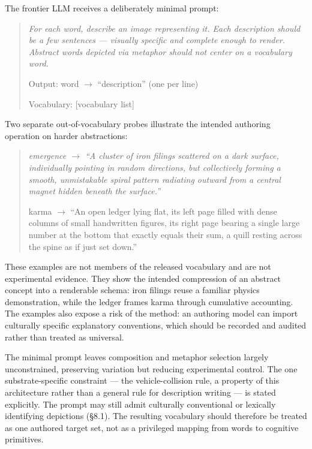 \documentclass[11pt,a4paper]{article}
\begin{document}
The frontier LLM receives a deliberately minimal prompt:

\begin{quote}
\small\itshape
For each word, describe an image representing it. Each description should be a few sentences --- visually specific and complete enough to render. Abstract words depicted via metaphor should not center on a vocabulary word.

\medskip
Output: word $\to$ ``description'' (one per line)

\medskip
Vocabulary: [vocabulary list]
\end{quote}

\begin{minipage}{\linewidth}
Two separate out-of-vocabulary probes illustrate the intended authoring operation on harder abstractions:

\begin{quote}
\small\itshape
emergence $\to$ ``A cluster of iron filings scattered on a dark surface, individually pointing in random directions, but collectively forming a smooth, unmistakable spiral pattern radiating outward from a central magnet hidden beneath the surface.''

\medskip
karma $\to$ ``An open ledger lying flat, its left page filled with dense columns of small handwritten figures, its right page bearing a single large number at the bottom that exactly equals their sum, a quill resting across the spine as if just set down.''
\end{quote}
\end{minipage}

These examples are not members of the released vocabulary and are not experimental evidence. They show the intended compression of an abstract concept into a renderable schema: iron filings reuse a familiar physics demonstration, while the ledger frames karma through cumulative accounting. The examples also expose a risk of the method: an authoring model can import culturally specific explanatory conventions, which should be recorded and audited rather than treated as universal.

The minimal prompt leaves composition and metaphor selection largely unconstrained, preserving variation but reducing experimental control. The one substrate-specific constraint --- the vehicle-collision rule, a property of this architecture rather than a general rule for description writing --- is stated explicitly. The prompt may still admit culturally conventional or lexically identifying depictions (§8.1). The resulting vocabulary should therefore be treated as one authored target set, not as a privileged mapping from words to cognitive primitives.
\end{document}
